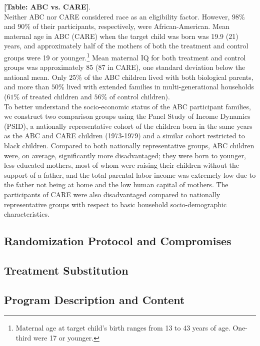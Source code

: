 \noindent \textbf{[Table: ABC vs. CARE]}.\\

\noindent Neither ABC nor CARE considered race as an eligibility factor. However, $98\%$ and $90\%$ of their participants, respectively, were African-American. Mean maternal age in ABC (CARE) when the target child was born was 19.9 (21) years, and approximately half of the mothers of both the treatment and control groups were 19 or younger.\footnote{Maternal age at target child’s birth ranges from 13 to 43 years of age. One-third were 17 or younger.} Mean maternal IQ for both treatment and control groups was approximately 85 (87 in CARE), one standard deviation below the national mean. Only $25\%$ of the ABC children lived with both biological parents, and more than $50\%$ lived with extended families in multi-generational households ($61\%$ of treated children and $56\%$ of control children).\\

\noindent To better understand the socio-economic status of the ABC participant families, we construct two comparison groups using the Panel Study of Income Dynamics (PSID), a nationally representative cohort of the children born in the same years as the ABC and CARE children (1973-1979) and a similar cohort restricted to black children. Compared to both nationally representative groups, ABC children were, on average, significantly more disadvantaged; they were born to younger, less educated mothers, most of whom were raising their children without the support of a father, and the total parental labor income was extremely low due to the father not being at home and the low human capital of mothers. The participants of CARE were also disadvantaged compared to nationally representative groups with respect to basic household socio-demographic characteristics.

\subsection{Randomization Protocol and Compromises}

\subsection{Treatment Substitution}

\subsection{Program Description and Content}

\clearpage
\singlespace



 